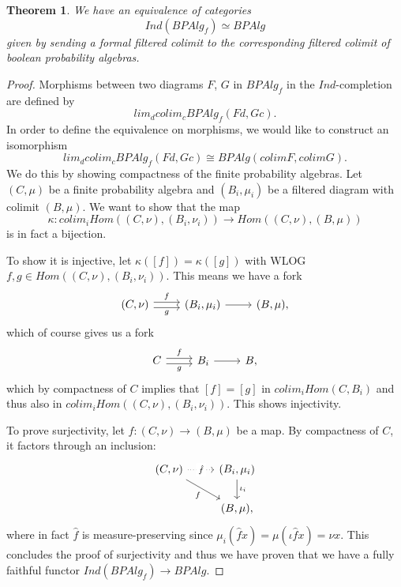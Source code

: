 \documentclass[a4paper]{amsproc}
\theoremstyle{plain}
\newtheorem{theorem}{Theorem}[section]
\theoremstyle{definition}
\theoremstyle{remark}
\numberwithin{equation}{section}
\begin{document}
\begin{theorem} \label{ind} We have an equivalence of categories
\[
Ind(BPAlg_f) \simeq BPAlg
\]
given by sending a formal filtered colimit to the corresponding filtered colimit of boolean probability algebras.
\end{theorem}
\begin{proof}
Morphisms between two diagrams $F$, $G$ in $BPAlg_f$ in the $Ind$-completion are defined by
\[
lim_d colim_c BPAlg_f(F d, G c).
\]
In order to define the equivalence on morphisms, we would like to construct an isomorphism
\[
lim_d colim_c BPAlg_f(F d, G c) \cong BPAlg(colim F, colim G).
\]
We do this by showing compactness of the finite probability algebras. Let $(C, \mu)$ be a finite probability algebra and $(B_i, \mu_i)$ be a filtered diagram with colimit $(B, \mu)$. We want to show that the map
\[
\kappa: colim_i Hom((C, \nu), (B_i, \nu_i)) \to Hom((C,\nu), (B,\mu))
\]
is in fact a bijection.

To show it is injective, let $\kappa([f]) = \kappa([g])$ with WLOG $f,g \in Hom((C,\nu), (B_i, \nu_i))$. This means we have a fork
\[
\begin{tikzcd}
{(C,\nu)} \arrow[r, "f", shift left] \arrow[r, "g"', shift right] & {(B_i,\mu_i)} \arrow[r] & {(B,\mu)},
\end{tikzcd}
\]
which of course gives us a fork
\[
\begin{tikzcd}
C \arrow[r, "f", shift left] \arrow[r, "g"', shift right] & B_i \arrow[r] & B,
\end{tikzcd}
\]
which by compactness of $C$ implies that $[f] = [g]$ in $colim_i Hom(C,B_i)$ and thus also in $colim_i Hom((C,\nu), (B_i, \nu_i))$. This shows injectivity.

To prove surjectivity, let $f:(C, \nu) \to (B,\mu)$ be a map. By compactness of $C$, it factors through an inclusion:
\[
\begin{tikzcd}
{(C,\nu)} \arrow[r, "\hat{f}" description, dotted] \arrow[rd, "f"'] & {(B_i,\mu_i)} \arrow[d, "\iota_i"] \\
                                                                & {(B,\mu)}                         ,
\end{tikzcd}
\]
where in fact $\hat{f}$ is measure-preserving since $\mu_i(\hat{f} x) = \mu(\iota \hat{f} x) = \nu x$. This concludes the proof of surjectivity and thus we have proven that we have a fully faithful functor $Ind(BPAlg_f) \to BPAlg$.


\end{proof}
\end{document}
